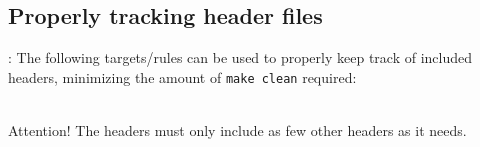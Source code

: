 \subsection{Properly tracking header files}
\begin{frame}{\secname: \small\subsecname\normalsize}
	The following targets/rules can be used to properly keep track of included headers, minimizing the amount of \texttt{make clean} required: \\~\\

	\makeHeaders

    \begin{alertblock}{Attention!}
        The headers must only include as few other headers as it needs.
    \end{alertblock}
\end{frame}
